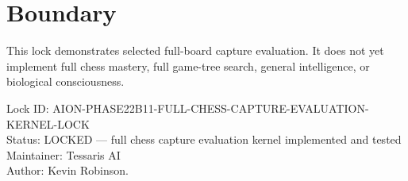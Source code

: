 \documentclass[11pt,a4paper]{article}
\begin{document}
\section{Boundary}

This lock demonstrates selected full-board capture evaluation. It does not yet implement full chess mastery, full game-tree search, general intelligence, or biological consciousness.

\bigskip

\noindent
Lock ID: AION-PHASE22B11-FULL-CHESS-CAPTURE-EVALUATION-KERNEL-LOCK\\
Status: LOCKED --- full chess capture evaluation kernel implemented and tested\\
Maintainer: Tessaris AI\\
Author: Kevin Robinson.
\end{document}
